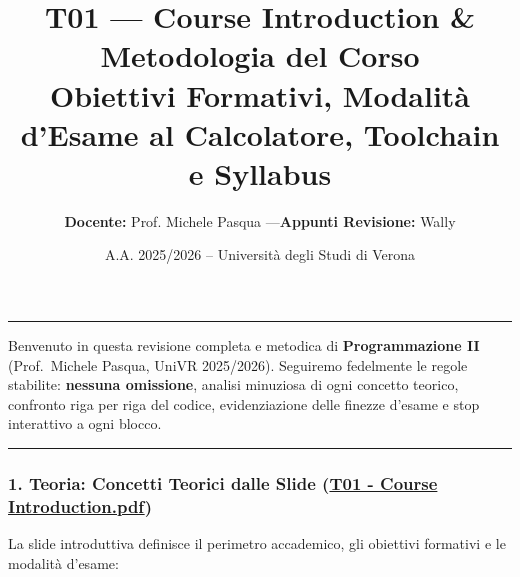 \documentclass[11pt,a4paper]{article}
\title{\Huge\bfseries\sffamily\color{brandblue} T01 --- Course Introduction \& Metodologia del Corso \\[0.3em] \large\sffamily Obiettivi Formativi, Modalità d'Esame al Calcolatore, Toolchain e Syllabus}
\author{\textbf{Docente:} Prof. Michele Pasqua \quad---\quad \textbf{Appunti Revisione:} Wally}
\date{A.A. 2025/2026 -- Universit\`a degli Studi di Verona}
\begin{document}
\maketitle
\thispagestyle{fancy}
\vspace{-1.2em}
\noindent\textcolor{brandblue}{\rule{\textwidth}{0.8pt}}
\vspace{1.2em}

Benvenuto in questa revisione completa e metodica di
\textbf{Programmazione II} (Prof.~Michele Pasqua, UniVR 2025/2026).
Seguiremo fedelmente le regole stabilite: \textbf{nessuna omissione},
analisi minuziosa di ogni concetto teorico, confronto riga per riga del
codice, evidenziazione delle finezze d'esame e stop interattivo a ogni
blocco.

\begin{center}\rule{0.5\linewidth}{0.5pt}\end{center}

\subsubsection{\texorpdfstring{1. Teoria: Concetti Teorici dalle Slide
(\href{file:///home/wally/Documenti/GitHub/Programmazione-II/25-26/Teoria-e-Esercitazioni/Slides-20260902/T01\%20-\%20Course\%20Introduction.pdf}{T01
- Course
Introduction.pdf})}{1. Teoria: Concetti Teorici dalle Slide (T01 - Course Introduction.pdf)}}\label{teoria-concetti-teorici-dalle-slide-t01---course-introduction.pdf}

La slide introduttiva definisce il perimetro accademico, gli obiettivi
formativi e le modalità d'esame:
\end{document}
